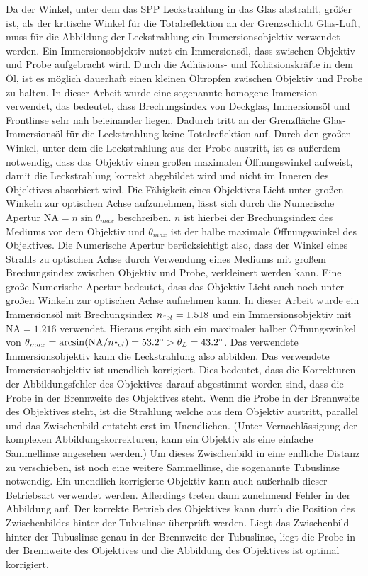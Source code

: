 \documentclass[titlepage]{article}
\begin{document}
	Da der Winkel, unter dem das SPP Leckstrahlung in das Glas abstrahlt, größer ist, als der kritische Winkel für die Totalreflektion an der Grenzschicht Glas-Luft, muss für die Abbildung der Leckstrahlung ein Immersionsobjektiv verwendet werden. Ein Immersionsobjektiv nutzt ein Immersionsöl, dass zwischen Objektiv und Probe aufgebracht wird. Durch die Adhäsions- und Kohäsionskräfte in dem Öl, ist es möglich dauerhaft einen kleinen Öltropfen zwischen Objektiv und Probe zu halten. In dieser Arbeit  wurde eine sogenannte homogene Immersion verwendet, das bedeutet, dass Brechungsindex von Deckglas, Immersionsöl und Frontlinse sehr nah beieinander liegen. Dadurch tritt an der Grenzfläche Glas-Immersionsöl für die Leckstrahlung keine Totalreflektion auf. Durch den großen Winkel, unter dem die Leckstrahlung aus der Probe austritt, ist es außerdem notwendig, dass das Objektiv einen großen maximalen Öffnungswinkel aufweist, damit die Leckstrahlung korrekt abgebildet wird und nicht im Inneren des Objektives absorbiert wird. Die Fähigkeit eines Objektives Licht unter großen Winkeln zur optischen Achse aufzunehmen, lässt sich durch die Numerische Apertur $\mathrm{NA} = n\sin\theta_{max}$ beschreiben. $n$ ist hierbei der Brechungsindex des Mediums vor dem Objektiv und $\theta_{max}$ ist der halbe maximale Öffnungswinkel des Objektives. Die Numerische Apertur berücksichtigt also, dass der Winkel eines Strahls zu optischen Achse durch Verwendung eines Mediums mit großem Brechungsindex zwischen Objektiv und Probe, verkleinert werden kann. Eine große Numerische Apertur bedeutet, dass das Objektiv Licht auch noch unter großen Winkeln zur optischen Achse aufnehmen kann. In dieser Arbeit wurde ein Immersionsöl mit Brechungsindex $n_{"ol} = 1.518$ und ein Immersionsobjektiv mit $\mathrm{NA} = 1.216$ verwendet. Hieraus ergibt sich ein maximaler halber Öffnungswinkel von $\theta_{max} = \arcsin(\mathrm{NA} / n_{"ol}) = 53.2^\circ > \theta_L = 43.2^\circ$. Das verwendete Immersionsobjektiv kann die Leckstrahlung also abbilden. Das verwendete Immersionsobjektiv ist unendlich korrigiert. Dies bedeutet, dass die Korrekturen der Abbildungsfehler des Objektives darauf abgestimmt worden sind, dass die Probe in der Brennweite des Objektives steht. Wenn die Probe in der Brennweite des Objektives steht, ist die Strahlung welche aus dem Objektiv austritt, parallel und das Zwischenbild entsteht erst im Unendlichen. (Unter Vernachlässigung der komplexen Abbildungskorrekturen, kann ein Objektiv als eine einfache Sammellinse angesehen werden.) Um dieses Zwischenbild in eine endliche Distanz zu verschieben, ist noch eine weitere Sammellinse, die sogenannte Tubuslinse notwendig. Ein unendlich korrigierte Objektiv kann auch außerhalb dieser Betriebsart verwendet werden. Allerdings treten dann zunehmend Fehler in der Abbildung auf. Der korrekte Betrieb des Objektives kann durch die Position des Zwischenbildes hinter der Tubuslinse überprüft werden. Liegt das Zwischenbild hinter der Tubuslinse genau in der Brennweite der Tubuslinse, liegt die Probe in der Brennweite des Objektives und die Abbildung des Objektives ist optimal korrigiert.\cite{Kuhl.2018}
\end{document}
